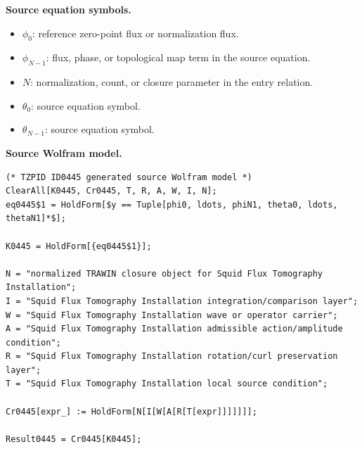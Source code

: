 \begin{minipage}[t]{0.49\linewidth}
\begingroup
\small
\raggedright
\textbf{Source equation symbols.}\par
\begin{itemize}[leftmargin=1.35em,itemsep=1pt,topsep=1pt,parsep=0pt]
    \item $\phi_0$: reference zero-point flux or normalization flux.
    \item $\phi_{N-1}$: flux, phase, or topological map term in the source equation.
    \item $N$: normalization, count, or closure parameter in the entry relation.
    \item $\theta_0$: source equation symbol.
    \item $\theta_{N-1}$: source equation symbol.
\end{itemize}
\endgroup
\end{minipage}\hfill
\begin{minipage}[t]{0.47\linewidth}
\begingroup
\scriptsize
\raggedright
\textbf{Source Wolfram model.}\par
\begin{Verbatim}[fontsize=\tiny,breaklines=true,breakanywhere=true]
(* TZPID ID0445 generated source Wolfram model *)
ClearAll[K0445, Cr0445, T, R, A, W, I, N];
eq0445$1 = HoldForm[$y == Tuple[phi0, ldots, phiN1, theta0, ldots, thetaN1]*$];

K0445 = HoldForm[{eq0445$1}];

N = "normalized TRAWIN closure object for Squid Flux Tomography Installation";
I = "Squid Flux Tomography Installation integration/comparison layer";
W = "Squid Flux Tomography Installation wave or operator carrier";
A = "Squid Flux Tomography Installation admissible action/amplitude condition";
R = "Squid Flux Tomography Installation rotation/curl preservation layer";
T = "Squid Flux Tomography Installation local source condition";

Cr0445[expr_] := HoldForm[N[I[W[A[R[T[expr]]]]]]];

Result0445 = Cr0445[K0445];
\end{Verbatim}
\endgroup
\end{minipage}

